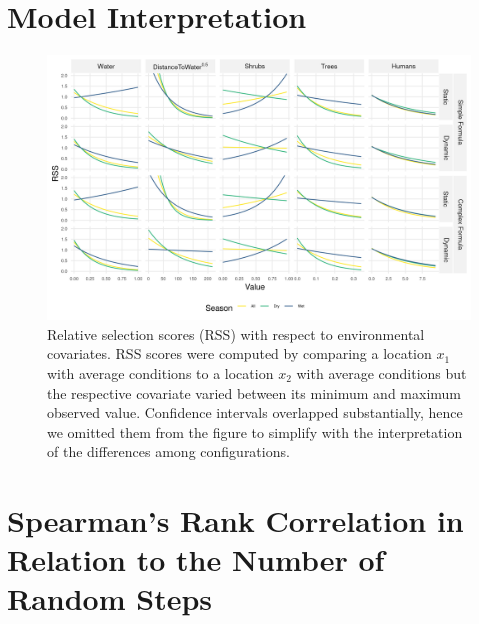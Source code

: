 \documentclass[abstract=on,10pt,a4paper,bibliography=totocnumbered]{article}
\begin{document}
\newpage
\section{Model Interpretation}

\begin{figure}[htbp]
 \begin{center}
  \includegraphics[width = \textwidth]{Figures/MovementModelInterpretation.png}
  \caption{Relative selection scores (RSS) with respect to environmental
  covariates. RSS scores were computed by comparing a location $x_1$ with
  average conditions to a location $x_2$ with average conditions but the
  respective covariate varied between its minimum and maximum observed value.
  Confidence intervals overlapped substantially, hence we omitted them from the
  figure to simplify with the interpretation of the differences among
  configurations.}
  \label{MovementModelInterpretation}
 \end{center}
\end{figure}

\newpage
\section{Spearman's Rank Correlation in Relation to the Number of Random Steps}
\end{document}
